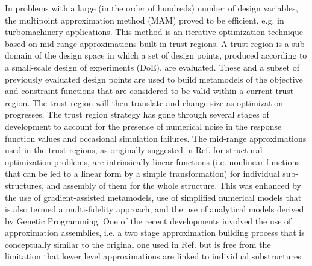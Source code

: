 \documentclass[10pt,twocolumn,a4paper]{article}
\begin{document}
In problems with a large (in the order of hundreds) number of design variables, the multipoint approximation method (MAM\cite{Toropov1989,Toropov1992,ToropovFilatov1993}) proved to be efficient, e.g. in turbomachinery applications\cite{ShahparPolynkinToropov2008,PolynkinToropovShahpar2008,PolynkinToropovShahpar2010}. This method is an iterative optimization technique based on mid-range approximations built in trust regions. A trust region is a sub-domain of the design space in which a set of design points, produced according to a small-scale design of experiments (DoE), are evaluated. These and a subset of previously evaluated design points are used to build metamodels of the objective and constraint functions that are considered to be valid within a current trust region. The trust region will then translate and change size as optimization progresses. The trust region strategy has gone through several stages of development to account for the presence of numerical noise in the response function values\cite{KeulenToropovMarkine1996,ToropovKeulenMarkine1996} and occasional simulation failures\cite{ToropovMarkineHolden1999}. The mid-range approximations used in the trust regions, as originally suggested in Ref. \cite{Toropov1989} for structural optimization problems, are intrinsically linear functions (i.e. nonlinear functions that can be led to a linear form by a simple transformation) for individual sub-structures, and assembly of them for the whole structure. This was enhanced by the use of gradient-assisted metamodels,\cite{ToropovFilatov1993} use of simplified numerical models that is also termed a multi-fidelity approach,\cite{ToropovMarkine1996} and the use of analytical models derived by Genetic Programming\cite{ToropovAlvarez1998}. One of the recent developments\cite{PolynkinToropov2012} involved the use of approximation assemblies, i.e. a two stage approximation building process that is conceptually similar to the original one used in Ref. \cite{Toropov1989} but is free from the limitation that lower level approximations are linked to individual substructures.
\end{document}
